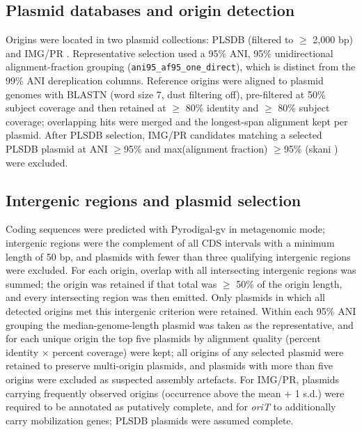 \subsection*{Plasmid databases and origin detection}

Origins were located in two plasmid collections: PLSDB \cite{molano2025plsdb} (filtered to $\geq$ 2,000 bp) and IMG/PR \cite{camargo2024img}.
Representative selection used a 95\% ANI, 95\% unidirectional
alignment-fraction grouping (\texttt{ani95\_af95\_one\_direct}), which is
distinct from the 99\% ANI dereplication columns. Reference origins were
aligned to plasmid genomes with BLASTN \cite{camacho2009blast} (word size 7, dust filtering off),
pre-filtered at 50\% subject coverage and then retained at $\geq$ 80\%
identity and $\geq$ 80\% subject coverage; overlapping hits were merged and
the longest-span alignment kept per plasmid. After PLSDB selection, IMG/PR
candidates matching a selected PLSDB plasmid at ANI $\geq$95\% and
max(alignment fraction) $\geq$95\% (skani \cite{shaw2023fast}) were excluded.

\subsection*{Intergenic regions and plasmid selection}

Coding sequences were predicted with Pyrodigal-gv
\cite{larralde2022pyrodigal,hyatt2010prodigal,camargo2024genomad} in
metagenomic mode; intergenic regions were the complement of all CDS
intervals with a minimum length of 50 bp, and plasmids with fewer than three
qualifying intergenic regions were excluded. For each origin, overlap with
all intersecting intergenic regions was summed; the origin was retained if
that total was $\geq$ 50\% of the origin length, and every intersecting
region was then emitted. Only plasmids in which all detected origins met this
intergenic criterion were retained. Within each 95\% ANI grouping the
median-genome-length plasmid was taken as the representative, and for each
unique origin the top five plasmids by alignment quality (percent identity
$\times$ percent coverage) were kept; all origins of any selected plasmid
were retained to preserve multi-origin plasmids, and plasmids with more than
five origins were excluded as suspected assembly artefacts. For IMG/PR,
plasmids carrying frequently observed origins (occurrence above the mean + 1
s.d.) were required to be annotated as putatively complete, and for
\emph{oriT} to additionally carry mobilization genes; PLSDB plasmids were
assumed complete.

